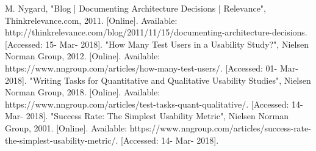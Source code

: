 \documentclass[12pt,a4paper]{article}
\begin{document}
    \begin{thebibliography}{20}
       M. Nygard, "Blog | Documenting Architecture Decisions | Relevance", Thinkrelevance.com, 2011. [Online]. Available: http://thinkrelevance.com/blog/2011/11/15/documenting-architecture-decisions. [Accessed: 15- Mar- 2018].
       "How Many Test Users in a Usability Study?", Nielsen Norman Group, 2012. [Online]. Available: https://www.nngroup.com/articles/how-many-test-users/. [Accessed: 01- Mar- 2018].
       "Writing Tasks for Quantitative and Qualitative Usability Studies", Nielsen Norman Group, 2018. [Online]. Available: https://www.nngroup.com/articles/test-tasks-quant-qualitative/. [Accessed: 14- Mar- 2018].
       "Success Rate: The Simplest Usability Metric", Nielsen Norman Group, 2001. [Online]. Available: https://www.nngroup.com/articles/success-rate-the-simplest-usability-metric/. [Accessed: 14- Mar- 2018].
    \end{thebibliography}
    
\end{document}
